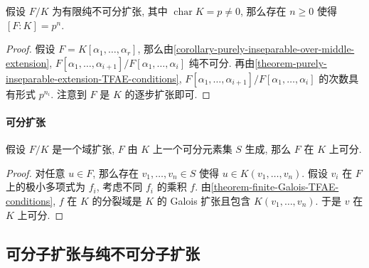\begin{corollary}
  \label{corollary-finite-purely-inseparable-degree}
  假设 \( F/K \) 为有限纯不可分扩张, 其中 \( \operatorname{char} K = p \neq 0
  \), 那么存在 \( n \geq 0 \) 使得 \( [F:K] = p^n \).
\end{corollary}
\begin{proof}
  假设 \( F = K[\alpha_1, \ldots, \alpha_r] \),
  那么由\cref{corollary-purely-inseparable-over-middle-extension}, \(
  F[\alpha_1,\ldots,\alpha_{i + 1}]/F[\alpha_1,\ldots,\alpha_i] \) 纯不可分.
  再由\cref{theorem-purely-inseparable-extension-TFAE-conditions}, \(
  F[\alpha_1,\ldots,\alpha_{i + 1}]/F[\alpha_1,\ldots,\alpha_i] \)
  的次数具有形式 \( p^{n_i} \).
  注意到 \( F \) 是 \( K \) 的逐步扩张即可.
\end{proof}

\paragraph{可分扩张}

\begin{proposition}
  \label{proposition-separate-elements-generate-separable-extension}
  假设 \( F/K \) 是一个域扩张, \( F \) 由 \( K \) 上一个可分元素集 \( S \) 生成,
  那么 \( F \) 在 \( K \) 上可分.
\end{proposition}
\begin{proof}
  对任意 \( u \in F \), 那么存在 \( v_1,\ldots,v_n \in S \) 使得 \( u \in
  K(v_1,\ldots,v_n) \).
  假设 \( v_i \) 在 \( F \) 上的极小多项式为 \( f_i \), 考虑不同 \( f_i \)
  的乘积 \( f \).
  由\cref{theorem-finite-Galois-TFAE-conditions}, \( f \) 在 \( K \) 的分裂域是
  \( K \) 的 Galois 扩张且包含 \( K(v_1, \ldots, v_n) \).
  于是 \( v \) 在 \( K \) 上可分.
\end{proof}

\subsection{可分子扩张与纯不可分子扩张}

